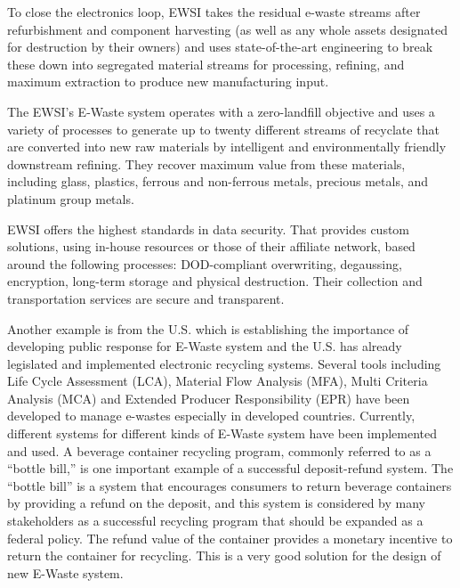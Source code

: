 To close the electronics loop, EWSI takes the residual e-waste streams after refurbishment and component harvesting (as well as any whole assets designated for destruction by their owners) and uses state-of-the-art engineering to break these down into segregated material streams for processing, refining, and maximum extraction to produce new manufacturing input.

The EWSI's E-Waste system operates with a zero-landfill objective and uses a variety of processes to generate up to twenty different streams of recyclate that are converted into new raw materials by intelligent and environmentally friendly downstream refining. They recover maximum value from these materials, including glass, plastics, ferrous and non-ferrous metals, precious metals, and platinum group metals.

EWSI offers the highest standards in data security. That provides custom solutions, using in-house resources or those of their affiliate network, based around the following processes: DOD-compliant overwriting, degaussing, encryption, long-term storage and physical destruction. Their collection and transportation services are secure and transparent.

Another example is from the U.S. which is establishing the importance of developing public response for E-Waste system and the U.S. has already legislated and implemented electronic recycling systems. Several tools including Life Cycle Assessment (LCA), Material Flow Analysis (MFA), Multi Criteria Analysis (MCA) and Extended Producer Responsibility (EPR) have been developed to manage e-wastes especially in developed countries\cite{kiddee2013electronic}. Currently, different systems for different kinds of E-Waste system have been implemented and used. A beverage container recycling program, commonly referred
to as a “bottle bill,” is one important example of a successful deposit-refund system. The “bottle bill” is a system that encourages consumers to return beverage containers by providing a refund on the deposit, and this system is considered by many stakeholders as a successful recycling program that should be expanded as a federal policy. The refund value of the container provides a monetary incentive to return the container for recycling\cite{kahhat2008exploring}. This is a very good solution for the design of new E-Waste system.